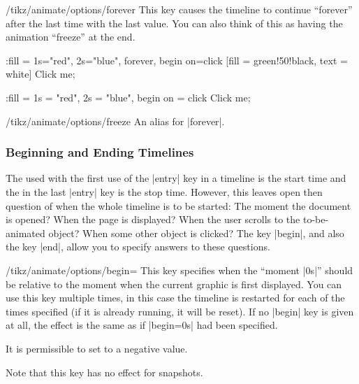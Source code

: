 \begin{key}{/tikz/animate/options/forever}
    This key causes the timeline to continue ``forever'' after the last time
    with the last value. You can also think of this as having the animation
    ``freeze'' at the end.
\begin{codeexample}[imagesource={standalone/pgfmanual-en-tikz-animations-animation-55.svg}]
\tikz \node :fill = { 1s="red", 2s="blue", forever, begin on=click}
  [fill = green!50!black, text = white] {Click me};
\end{codeexample}
\begin{codeexample}[imagesource={standalone/pgfmanual-en-tikz-animations-animation-56.svg}]
\tikz \node [fill = green!50!black, text = white]
    :fill = { 1s = "red", 2s = "blue", begin on = click }
  {Click me};
\end{codeexample}
\end{key}

\begin{key}{/tikz/animate/options/freeze}
    An alias for |forever|.
\end{key}


\subsubsection{Beginning and Ending Timelines}
\label{section-anim-begin-end}

The  used with the first use of the |entry| key in a timeline is the
start time and the  in the last |entry| key is the stop time.
However, this leaves open then question of when the whole timeline is to be
started: The moment the document is opened? When the page is displayed? When
the user scrolls to the to-be-animated object? When some other object is
clicked? The key |begin|, and also the key |end|, allow you to specify answers
to these questions.

\begin{key}{/tikz/animate/options/begin=}
    This key specifies when the ``moment |0s|'' should be relative to the
    moment when the current graphic is first displayed. You can use this key
    multiple times, in this case the timeline is restarted for each of the
    times specified (if it is already running, it will be reset). If no |begin|
    key is given at all, the effect is the same as if |begin=0s| had been
    specified.

    It is permissible to set  to a negative value.

    Note that this key has no effect for snapshots.
\end{key}

